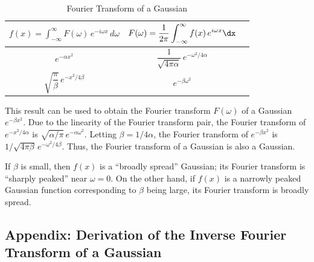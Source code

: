 \begin{table}[H]
\centering
\caption{Fourier Transform of a Gaussian}
\label{tab:ft-gaussian}
\begin{tabular}{ccc}
\toprule
$f(x) = \displaystyle\int_{-\infty}^{\infty} F(\omega)\,e^{-i\omega x}\,d\omega$ &
$F(\omega) = \displaystyle\frac{1}{2\pi}\int_{-\infty}^{\infty} f(x)\,e^{i\omega x}\dx$ \\
\midrule
$e^{-\alpha x^2}$ & $\dfrac{1}{\sqrt{4\pi\alpha}}\,e^{-\omega^2/4\alpha}$ \\[6pt]
$\sqrt{\dfrac{\pi}{\beta}}\,e^{-x^2/4\beta}$ & $e^{-\beta\omega^2}$ \\
\bottomrule
\end{tabular}
\end{table}

This result can be used to obtain the Fourier transform $F(\omega)$ of a Gaussian $e^{-\beta x^2}$.  Due to the linearity of the Fourier transform pair, the Fourier transform of $e^{-x^2/4\alpha}$ is $\sqrt{\alpha/\pi}\,e^{-\alpha\omega^2}$.  Letting $\beta = 1/4\alpha$, the Fourier transform of $e^{-\beta x^2}$ is $1/\sqrt{4\pi\beta}\,e^{-\omega^2/4\beta}$.  Thus, the Fourier transform of a Gaussian is also a Gaussian.

If $\beta$ is small, then $f(x)$ is a ``broadly spread'' Gaussian; its Fourier transform is ``sharply peaked'' near $\omega = 0$.  On the other hand, if $f(x)$ is a narrowly peaked Gaussian function corresponding to $\beta$ being large, its Fourier transform is broadly spread.

\subsection{Appendix: Derivation of the Inverse Fourier Transform of a Gaussian}
\label{subsec:ft-gaussian-derivation}

